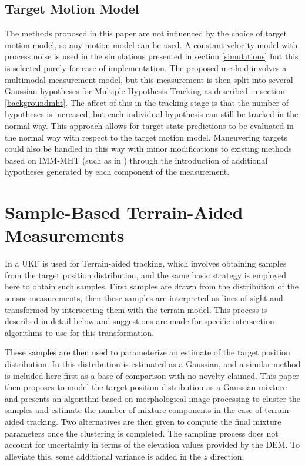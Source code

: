 \documentclass[journal]{IEEEtran}
\begin{document}
\subsection{Target Motion Model}
The methods proposed in this paper are not influenced by the choice of target motion model, so any motion model can be used. A constant velocity model with process noise is used in the simulations presented in section \ref{simulations} but this is selected purely for ease of implementation. The proposed method involves a multimodal measurement model, but this measurement is then split into several Gaussian hypotheses for Multiple Hypothesis Tracking as described in section \ref{backgroundmht}. The affect of this in the tracking stage is that the number of hypotheses is increased, but each individual hypothesis can still be tracked in the normal way. This approach allows for target state predictions to be evaluated in the normal way with respect to the target motion model. Maneuvering targets could also be handled in this way with minor modifications to existing methods based on IMM-MHT (such as in \cite{liu2019multiple}) through the introduction of additional hypotheses generated by each component of the measurement.








\section{Sample-Based Terrain-Aided Measurements} \label{samplebasedmeasurements}
In \cite{kim2009terrain} a UKF is used for Terrain-aided tracking, which involves obtaining samples from the target position distribution, and the same basic strategy is employed here to obtain such samples. First samples are drawn from the distribution of the sensor measurements, then these samples are interpreted as lines of sight and transformed by intersecting them with the terrain model. This process is described in detail below and suggestions are made for specific intersection algorithms to use for this transformation.

These samples are then used to parameterize an estimate of the target position distribution. In \cite{kim2009terrain} this distribution is estimated as a Gaussian, and a similar method is included here first as a base of comparison with no novelty claimed. This paper then proposes to model the target position distribution as a Gaussian mixture and presents an algorithm based on morphological image processing to cluster the samples and estimate the number of mixture components in the case of terrain-aided tracking. Two alternatives are then given to compute the final mixture parameters once the clustering is completed. The sampling process does not account for uncertainty in terms of the elevation values provided by the DEM. To alleviate this, some additional variance is added in the $z$ direction.
\end{document}

